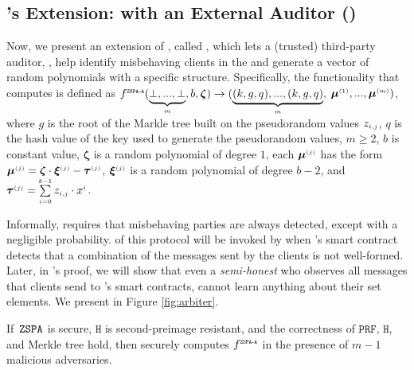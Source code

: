 




\vspace{-2mm}

\subsection{\zspa's Extension: \zspa with an External Auditor (\zspaa)}
\vspace{-1mm}

Now, we present an extension of \zspa, called \zspaa, which lets a (trusted) third-party auditor, \aud, help identify misbehaving clients in the \zspa and generate a vector of random polynomials with a specific structure. Specifically, the functionality that \zspaa computes is defined as 
%
$f^{\scriptscriptstyle \mathtt{ZSPA\text{-}A}}(\underbrace{\bot,..., \bot}_{\scriptscriptstyle m}, b, \bm\zeta)\rightarrow (\underbrace{(k, g, q),..., (k, g,q)}_{\scriptscriptstyle m},$ $\bm\mu^{\scriptscriptstyle (1)},..., \bm\mu^{\scriptscriptstyle (m)})$, where $g$ is the root of the Markle tree built on the pseudorandom values $z_{\scriptscriptstyle i, j}$, $q$ is the hash value of the key used to generate the pseudorandom values, $m\geq 2$, $b$ is constant value, $\bm\zeta$ is a random polynomial of degree $1$, each $\bm\mu^{\scriptscriptstyle (j)} $ has the form $\bm\mu^{\scriptscriptstyle (j)} = \bm\zeta\cdot \bm\xi^{\scriptscriptstyle (j)}-\bm\tau^{\scriptscriptstyle (j)}$,  $\bm\xi^{\scriptscriptstyle (j)}$ is a random polynomial of degree $b-2$, and $\bm\tau^{\scriptscriptstyle (j)}=\sum\limits^{\scriptscriptstyle b-1}_{\scriptscriptstyle i=0}z_{\scriptscriptstyle i,j}\cdot x^{\scriptscriptstyle i}$. 



Informally, \zspaa requires that misbehaving parties are always detected, except with a negligible probability. \aud of this protocol will be invoked by \withFai when \withFai's smart contract detects that a combination of the messages sent by the clients is not well-formed. Later, in \withFai's proof, we will show that even a \emph{semi-honest} \aud who observes all messages that clients send to \withFai's smart contracts, cannot learn anything about their set elements. We present \zspaa in Figure \ref{fig:arbiter}. 

\vspace{-1mm}



\vspace{-1mm}
\begin{theorem}\label{theorem::ZSPA-A}
If\ $\mathtt{ZSPA}$ is secure, $\mathtt{H}$ is second-preimage resistant, and the correctness of $\mathtt{PRF}$, $\mathtt{H}$, and Merkle tree hold,  then \zspaa securely computes $f^{\scriptscriptstyle \mathtt{ZSPA\text{-}A}}$ in the presence of $m-1 $ malicious adversaries.%
\end{theorem}

